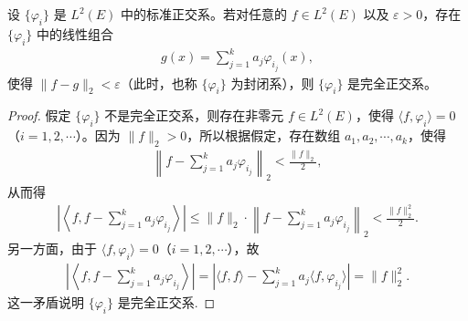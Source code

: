 \documentclass[../../main.tex]{subfiles}%
\begin{document}
\begin{theorem}
设 $\{\varphi_i\}$ 是 $L^2(E)$ 中的标准正交系。若对任意的 $f \in L^2(E)$ 以及 $\varepsilon > 0$，存在 $\{\varphi_i\}$ 中的线性组合
\begin{align*}
g(x) = \sum_{j=1}^k a_j \varphi_{i_j}(x),
\end{align*}
使得 $\|f - g\|_2 < \varepsilon$（此时，也称 $\{\varphi_i\}$ 为封闭系），则 $\{\varphi_i\}$ 是完全正交系。
\end{theorem}
\begin{proof}
假定 $\{\varphi_i\}$ 不是完全正交系，则存在非零元 $f \in L^2(E)$，使得 $\langle f, \varphi_i \rangle = 0$（$i=1,2,\cdots$）。因为 $\|f\|_2 > 0$，所以根据假定，存在数组 $a_1, a_2, \cdots, a_k$，使得
\begin{align*}
\left\| f - \sum_{j=1}^k a_j \varphi_{i_j} \right\|_2 < \frac{\|f\|_2}{2},
\end{align*}
从而得
\begin{align*}
\left| \left\langle f, f - \sum_{j=1}^k a_j \varphi_{i_j} \right\rangle \right| \leqslant \|f\|_2 \cdot \left\| f - \sum_{j=1}^k a_j \varphi_{i_j} \right\|_2 < \frac{\|f\|_2^2}{2}.
\end{align*}
另一方面，由于 $\langle f, \varphi_i \rangle = 0$（$i=1,2,\cdots$），故
\begin{align*}
\left| \left\langle f, f - \sum_{j=1}^k a_j \varphi_{i_j} \right\rangle \right| = \left| \langle f, f \rangle - \sum_{j=1}^k a_j \langle f, \varphi_{i_j} \rangle \right| = \|f\|_2^2.
\end{align*}
这一矛盾说明 $\{\varphi_i\}$ 是完全正交系.
\end{proof}
\end{document}
